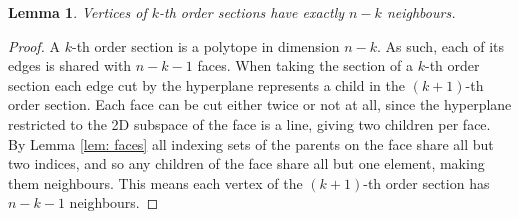 \documentclass[a0paper,landscape,final]{baposter}
\newtheorem{lemma}{Lemma}
\begin{document}
\begin{poster}
{\begin{lemma}
Vertices of $k$-th order sections have exactly $n-k$ neighbours.
\end{lemma}

\begin{proof}
A $k$-th order section is a polytope in dimension $n-k$.
As such, each of its edges is shared with $n-k-1$ faces.
When taking the section of a $k$-th order section each edge cut by the hyperplane represents a child in the $(k+1)$-th order section.
Each face can be cut either twice or not at all, since the hyperplane restricted to the 2D subspace of the face is a line, giving two children per face.
By Lemma \ref{lem: faces} all indexing sets of the parents on the face share all but two indices, and so any children of the face share all but one element, making them neighbours.
This means each vertex of the $(k+1)$-th order section has $n-k-1$ neighbours.
\end{proof}
}


 
\end{poster}
\end{document}
